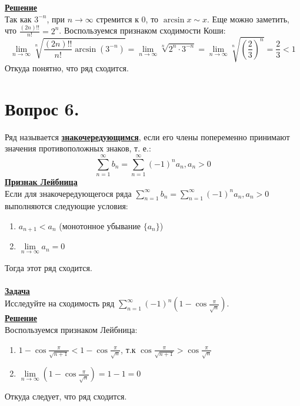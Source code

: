 \documentclass{report}
\begin{document}
\textbf{\uline{Решение}}\\
Так как $3^{-n}$, при $n \to \infty$ стремится к $0$, то $\arcsin{x} \sim x$.
Еще можно заметить, что $\frac{(2n)!!}{n!} = 2^n$.
Воспользуемся признаком сходимости Коши:
$$\lim\limits_{n \to \infty} \sqrt[n]{\frac{(2n)!!}{n!} \arcsin{(3^{-n})}} = \lim\limits_{n \to \infty} \sqrt[n]{2^n \cdot 3^{-n}} = \lim\limits_{n \to \infty} \sqrt[n]{\left(\frac{2}{3}\right)^n} = \frac{2}{3} < 1$$
Откуда понятно, что ряд сходится.
\newpage

\section{Вопрос 6.}
Ряд называется \textbf{\uline{знакочередующимся}}, если его члены попеременно принимают значения противоположных знаков, т. е.:
$$\sum\limits_{n = 1}^\infty b_n = \sum\limits_{n = 1}^\infty (-1)^{n}a_n, a_n > 0$$
\textbf{\uline{Признак Лейбница}}\\
Если для знакочередующегося ряда $\sum\limits_{n = 1}^\infty b_n = \sum\limits_{n = 1}^\infty (-1)^{n}a_n, a_n > 0$ выполняются следующие условия:
\begin{enumerate}
    \item $a_{n+1} < a_n$ (монотонное убывание $\{ a_n\}$)
    \item $\lim\limits_{n \to \infty} a_n = 0$
\end{enumerate}
Тогда этот ряд сходится.\\\\
\textbf{\uline{Задача}}\\
Исследуйте на сходимость ряд $\sum\limits_{n = 1}^\infty (-1)^{n} \left(1 - \cos{\frac{\pi}{\sqrt{n}}}\right)$.\\
\textbf{\uline{Решение}}\\
Воспользуемся признаком Лейбница:\\
\begin{enumerate}
    \item $1 - \cos{\frac{\pi}{\sqrt{n + 1}}} < 1 - \cos{\frac{\pi}{\sqrt{n}}}$, т.к $\cos{\frac{\pi}{\sqrt{n+1}}} > \cos{\frac{\pi}{\sqrt{n}}}$
    \item $\lim\limits_{n \to \infty} \left( 1 - \cos{\frac{\pi}{\sqrt{n}}} \right) = 1 - 1 = 0$
\end{enumerate}
Откуда следует, что ряд сходится.
\newpage
\end{document}
